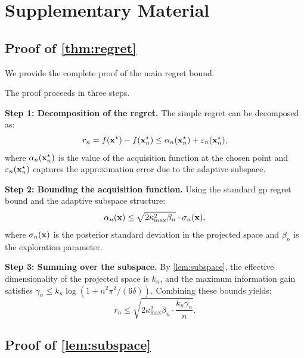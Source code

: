 \chapter{Supplementary Material}
\label{ch:appendix-a}

\section{Proof of \cref{thm:regret}}
\label{sec:proof-main}

We provide the complete proof of the main regret bound.

\begin{proofbox}
The proof proceeds in three steps.

\textbf{Step 1: Decomposition of the regret.}
The simple regret can be decomposed as:
\begin{equation}
    r_n = f(\mathbf{x}^\star) - f(\mathbf{x}_n^\star) \leq
    \alpha_n(\mathbf{x}_n^\star) + \varepsilon_n(\mathbf{x}_n^\star),
    \label{eq:regret-decompose}
\end{equation}
where $\alpha_n(\mathbf{x}_n^\star)$ is the value of the acquisition function at the
chosen point and $\varepsilon_n(\mathbf{x}_n^\star)$ captures the approximation error
due to the adaptive subspace.

\textbf{Step 2: Bounding the acquisition function.}
Using the standard \gls{gp} regret bound and the adaptive subspace structure:
\begin{equation}
    \alpha_n(\mathbf{x}) \leq \sqrt{2\kappa_{\max}^2 \beta_n} \cdot \sigma_n(\mathbf{x}),
    \label{eq:acquisition-bound}
\end{equation}
where $\sigma_n(\mathbf{x})$ is the posterior standard deviation in the projected
space and $\beta_n$ is the exploration parameter.

\textbf{Step 3: Summing over the subspace.}
By \cref{lem:subspace}, the effective dimensionality of the projected space is
$k_n$, and the maximum information gain satisfies $\gamma_n \leq
k_n \log(1 + n^2 \pi^2 / (6\delta))$.  Combining these bounds yields:
\begin{equation}
    r_n \leq \sqrt{2\kappa_{\max}^2 \beta_n \cdot \frac{k_n \gamma_n}{n}}.
    \label{eq:final-bound}
\end{equation}
\end{proofbox}

\section{Proof of \cref{lem:subspace}}
\label{sec:proof-subspace}

